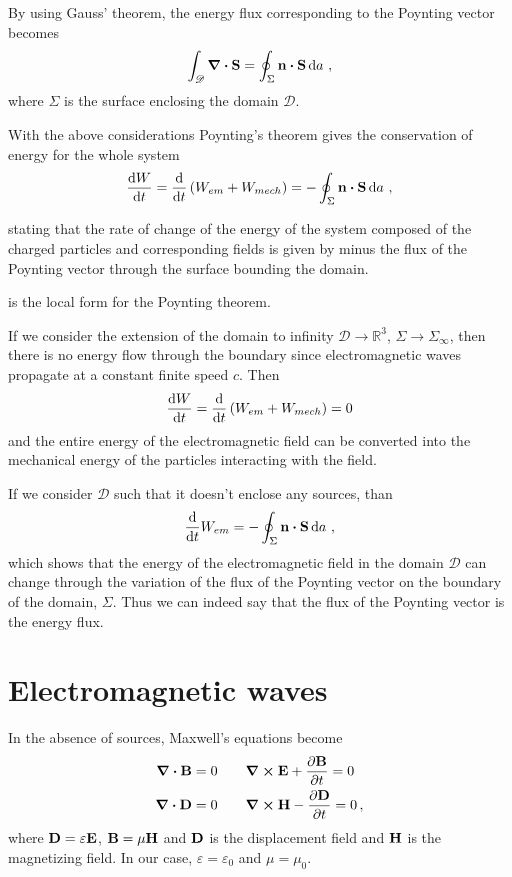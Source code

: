 \documentclass[12pt, class=report, crop=false]{standalone}
\begin{document}
By using Gauss' theorem, the energy flux corresponding to the
Poynting vector becomes
\[
  \int_{\mathscr{D}} \div{\vb{S}} = \oint_\Sigma \vb{n} \vdot \vb{S} \dd{a}\,,
\]
where \(\Sigma\) is the surface enclosing the domain \(\mathscr{D}\).

With the above considerations Poynting's theorem gives the conservation of energy for the whole system
\begin{equation}
  \label{eq:poynting-theorem}
  \dv{W}{t} = \dv{t} \left( W_{em} + W_{mech} \right) =
  -\oint_\Sigma \vb{n} \vdot \vb{S} \dd{a}\,,
\end{equation}

stating that the rate of change of the energy of the system composed of the charged
particles and corresponding fields is given by minus the flux of the
Poynting vector through the surface bounding the domain.

 is the local form for the Poynting
theorem.

If we consider the extension of the domain to infinity \(\mathscr{D} \to \mathbb{R}^3\),
\(\Sigma \to \Sigma_\infty\), then there is no energy flow through the
boundary since electromagnetic waves propagate at a constant finite speed \(c\). Then
\[
  \dv{W}{t} = \dv{t} \left( W_{em} + W_{mech} \right) = 0
\]
and the entire energy of the electromagnetic field can be converted into
the mechanical energy of the particles interacting with the field.

If we consider \(\mathscr{D}\) such that it doesn't enclose any sources, than
\[
  \dv{t} W_{em} = -\oint_\Sigma \vb{n} \vdot \vb{S} \dd{a}\,,
\]
which shows that the energy of the electromagnetic field in the domain
\(\mathscr{D}\) can change through the variation of the flux of the
Poynting vector on the boundary of the domain, \(\Sigma\). Thus we can
indeed say that the flux of the Poynting vector is the energy flux.

\section{Electromagnetic waves}

In the absence of sources, Maxwell's equations become
\begin{subequations}
  \begin{align*}
    \div{\vb{B}} &= 0  \qquad \curl{\vb{E}} + \pdv{\vb{B}}{t} = 0 \\
    \div{\vb{D}} &= 0  \qquad \curl{\vb{H}} - \pdv{\vb{D}}{t} = 0\,,
  \end{align*}
\end{subequations}
where \(\vb{D} = \varepsilon \vb{E}\), \(\vb{B} = \mu \vb{H}\) and \(\vb{D}\) is
the displacement field and \(\vb{H}\) is the magnetizing field.
In our case, \(\varepsilon = \varepsilon_0\) and \(\mu = \mu_0\).
\end{document}
